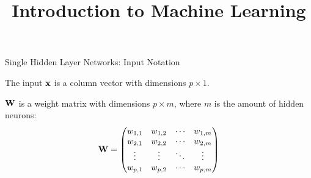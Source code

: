 \documentclass[11pt,compress,t,notes=noshow, xcolor=table]{beamer}
\title{Introduction to Machine Learning}
\begin{document}


%
%

\begin{framei}[sep=L]{Single Hidden Layer Networks: Input Notation}

\item The input $\mathbf{x}$ is a column vector with dimensions $p \times 1$. 
\item $\mathbf{W}$ is a weight matrix with dimensions $p \times m$, where $m$ is the amount of hidden neurons:
$$\mathbf{W} =
     \begin{pmatrix}
      w_{1,1} & w_{1,2} & \cdots & w_{1,m} \\
      w_{2,1} & w_{2,2} & \cdots & w_{2,m} \\
      \vdots  & \vdots  & \ddots & \vdots  \\
      w_{p,1} & w_{p,2} & \cdots & w_{p,m}
     \end{pmatrix}$$
     
     \end{framei}
     
\end{document}
